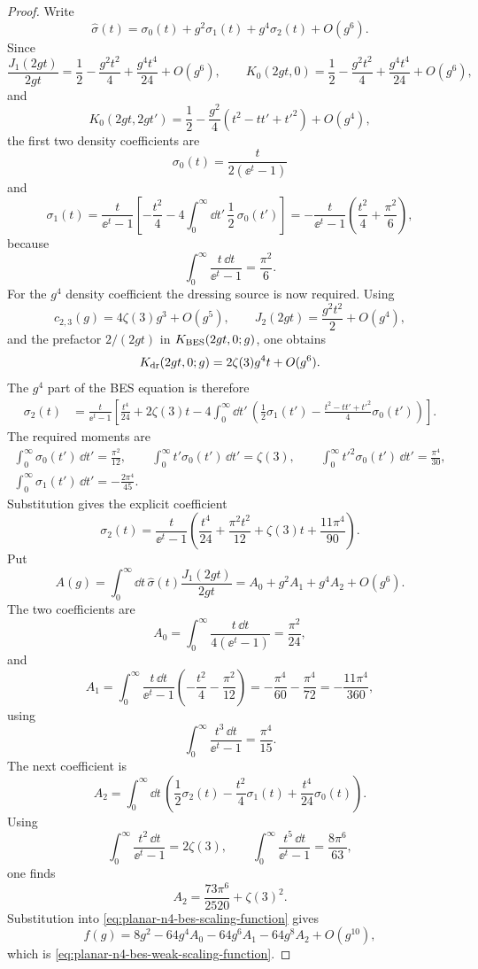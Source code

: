 \begin{proof}
Write
\[
  \widehat\sigma(t)=\sigma_0(t)+g^2\sigma_1(t)+g^4\sigma_2(t)+O(g^6).
\]
Since
\[
  \frac{J_1(2gt)}{2gt}
  =
  \frac12-\frac{g^2t^2}{4}+\frac{g^4t^4}{24}+O(g^6),
  \qquad
  K_0(2gt,0)=\frac12-\frac{g^2t^2}{4}+\frac{g^4t^4}{24}+O(g^6),
\]
and
\[
  K_0(2gt,2gt')
  =
  \frac12
  -
  \frac{g^2}{4}(t^2-tt'+t'^2)
  +O(g^4),
\]
the first two density coefficients are
\[
  \sigma_0(t)=\frac{t}{2(\ee^t-1)}
\]
and
\[
  \sigma_1(t)
  =
  \frac{t}{\ee^t-1}
  \left[
    -\frac{t^2}{4}
    -4\int_0^\infty\dd t'\,\frac12\,\sigma_0(t')
  \right]
  =
  -\frac{t}{\ee^t-1}
  \left(\frac{t^2}{4}+\frac{\pi^2}{6}\right),
\]
because
\[
  \int_0^\infty\frac{t\,\dd t}{\ee^t-1}=\frac{\pi^2}{6}.
\]
For the \(g^4\) density coefficient the dressing source is now required.
Using
\[
  c_{2,3}(g)=4\zeta(3)g^3+O(g^5),
  \qquad
  J_2(2gt)=\frac{g^2t^2}{2}+O(g^4),
\]
and the prefactor \(2/(2gt)\) in \(K_{\rm BES}(2gt,0;g)\), one obtains
\[
  K_{\rm dr}(2gt,0;g)
  =
  2\zeta(3)g^4t+O(g^6).
\]
The \(g^4\) part of the BES equation is therefore
\[
\begin{aligned}
  \sigma_2(t)
  &=
  \frac{t}{\ee^t-1}
  \left[
    \frac{t^4}{24}+2\zeta(3)t
    -4\int_0^\infty\dd t'\,
    \left(
      \frac12\sigma_1(t')
      -\frac{t^2-tt'+t'^2}{4}\sigma_0(t')
    \right)
  \right].
\end{aligned}
\]
The required moments are
\[
\begin{gathered}
  \int_0^\infty\sigma_0(t')\,\dd t'=\frac{\pi^2}{12},
  \qquad
  \int_0^\infty t'\sigma_0(t')\,\dd t'=\zeta(3),
  \qquad
  \int_0^\infty t'^2\sigma_0(t')\,\dd t'=\frac{\pi^4}{30},\\
  \int_0^\infty\sigma_1(t')\,\dd t'=-\frac{2\pi^4}{45}.
\end{gathered}
\]
Substitution gives the explicit coefficient
\[
  \sigma_2(t)
  =
  \frac{t}{\ee^t-1}
  \left(
    \frac{t^4}{24}
    +\frac{\pi^2t^2}{12}
    +\zeta(3)t
    +\frac{11\pi^4}{90}
  \right).
\]
Put
\[
  A(g)=
  \int_0^\infty\dd t\,
  \widehat\sigma(t)\frac{J_1(2gt)}{2gt}
  =
  A_0+g^2A_1+g^4A_2+O(g^6).
\]
The two coefficients are
\[
  A_0
  =
  \int_0^\infty\frac{t\,\dd t}{4(\ee^t-1)}
  =
  \frac{\pi^2}{24},
\]
and
\[
  A_1
  =
  \int_0^\infty\frac{t\,\dd t}{\ee^t-1}
  \left(-\frac{t^2}{4}-\frac{\pi^2}{12}\right)
  =
  -\frac{\pi^4}{60}-\frac{\pi^4}{72}
  =
  -\frac{11\pi^4}{360},
\]
using
\[
  \int_0^\infty\frac{t^3\,\dd t}{\ee^t-1}=\frac{\pi^4}{15}.
\]
The next coefficient is
\[
  A_2
  =
  \int_0^\infty\dd t\,
  \left(
    \frac12\sigma_2(t)
    -\frac{t^2}{4}\sigma_1(t)
    +\frac{t^4}{24}\sigma_0(t)
  \right).
\]
Using
\[
  \int_0^\infty\frac{t^2\,\dd t}{\ee^t-1}=2\zeta(3),
  \qquad
  \int_0^\infty\frac{t^5\,\dd t}{\ee^t-1}
  =
  \frac{8\pi^6}{63},
\]
one finds
\[
  A_2=\frac{73\pi^6}{2520}+\zeta(3)^2.
\]
Substitution into
\eqref{eq:planar-n4-bes-scaling-function} gives
\[
  f(g)=8g^2-64g^4A_0-64g^6A_1-64g^8A_2+O(g^{10}),
\]
which is \eqref{eq:planar-n4-bes-weak-scaling-function}.
\end{proof}


